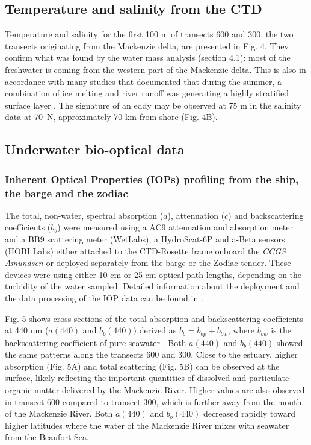 \documentclass[essd, manuscript]{copernicus}
\begin{document}
\subsection{Temperature and salinity from the CTD}

Temperature and salinity for the first 100 m of transects 600 and 300, the two transects originating from the Mackenzie delta, are presented in Fig. 4. They confirm what was found by the water mass analysis (section 4.1): most of the freshwater is coming from the western part of the Mackenzie delta. This is also in accordance with many studies that documented that during the summer, a combination of ice melting and river runoff was generating a highly stratified surface layer \citep{Carmack2002, Forest2013}. The signature of an eddy may be observed at 75 m in the salinity data at 70~\textdegree N, approximately 70 km from shore (Fig. 4B).

\subsection{Underwater bio-optical data}

\subsubsection{Inherent Optical Properties (IOPs) profiling from the ship, the barge and the zodiac}

The total, non-water, spectral absorption ($a$), attenuation ($c$) and backscattering coefficients ($b_b$) were measured using a AC9 attenuation and absorption meter and a BB9 scattering meter (WetLabs), a HydroScat-6P and a-Beta sensors (HOBI Labs) either attached to the CTD-Rosette frame onboard the \textit{CCGS Amundsen} or deployed separately from the barge or the Zodiac tender. These devices were using either 10 cm or 25 cm optical path lengths, depending on the turbidity of the water sampled. Detailed information about the deployment and the data processing of the IOP data can be found in \citet{Doxaran2012}.

Fig. 5 shows cross-sections of the total absorption and backscattering coefficients at 440 nm ($a(440)$ and $b_b(440))$ derived as $b_b = b_{bp} + b_{bw}$, where $b_{bw}$ is the backscattering coefficient of pure seawater \citep{Morel1974}. Both $a(440)$ and $b_b(440)$ showed the same patterns along the transects 600 and 300. Close to the estuary, higher absorption (Fig. 5A) and total scattering (Fig. 5B) can be observed at the surface, likely reflecting the important quantities of dissolved and particulate organic matter delivered by the Mackenzie River. Higher values are also observed in transect 600 compared to transect 300, which is further away from the mouth of the Mackenzie River. Both $a(440)$ and $b_b(440)$ decreased rapidly toward higher latitudes where the water of the Mackenzie River mixes with seawater from the Beaufort Sea.
\end{document}
